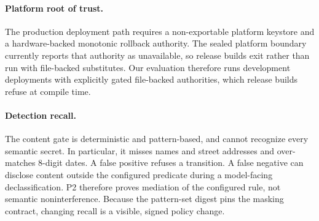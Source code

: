\documentclass[letterpaper,twocolumn,10pt]{article}
\begin{document}
\paragraph{Platform root of trust.} The production deployment path
requires a non-exportable platform keystore and a hardware-backed
monotonic rollback authority. The sealed platform boundary currently
reports that authority as unavailable, so release builds exit rather than
run with file-backed substitutes. Our evaluation therefore runs
development deployments with explicitly gated file-backed authorities,
which release builds refuse at compile time.

\paragraph{Detection recall.} The content gate is deterministic and
pattern-based, and cannot recognize every semantic secret. In particular,
it misses names and street addresses and over-matches 8-digit dates. A
false positive refuses a transition. A false negative can disclose
content outside the configured predicate during a model-facing
declassification. P2 therefore proves mediation of the configured rule,
not semantic noninterference. Because the pattern-set digest pins the
masking contract, changing recall is a visible, signed policy change.
\end{document}
